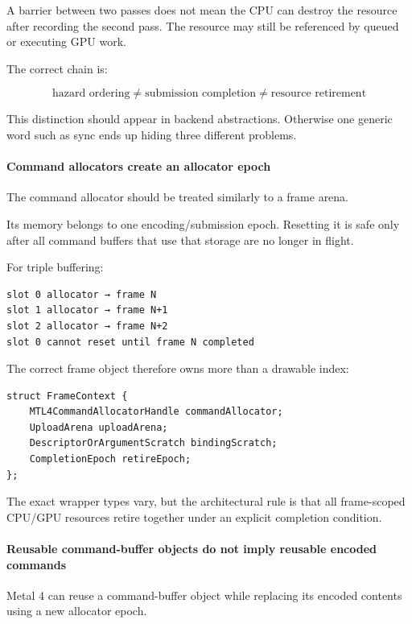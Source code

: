 A barrier between two passes does not mean the CPU can destroy the resource after recording the second pass. The resource may still be referenced by queued or executing GPU work.

The correct chain is:

\[
\boxed{
\text{hazard ordering}
\neq
\text{submission completion}
\neq
\text{resource retirement}
}
\]

This distinction should appear in backend abstractions. Otherwise one generic word such as sync ends up hiding three different problems.

\paragraph{Command allocators create an allocator epoch}\label{command-allocators-create-an-allocator-epoch}

The command allocator should be treated similarly to a frame arena.

Its memory belongs to one encoding/submission epoch. Resetting it is safe only after all command buffers that use that storage are no longer in flight.

For triple buffering:

\begin{verbatim}
slot 0 allocator → frame N
slot 1 allocator → frame N+1
slot 2 allocator → frame N+2
slot 0 cannot reset until frame N completed
\end{verbatim}

The correct frame object therefore owns more than a drawable index:

\begin{verbatim}
struct FrameContext {
    MTL4CommandAllocatorHandle commandAllocator;
    UploadArena uploadArena;
    DescriptorOrArgumentScratch bindingScratch;
    CompletionEpoch retireEpoch;
};
\end{verbatim}

The exact wrapper types vary, but the architectural rule is that all frame-scoped CPU/GPU resources retire together under an explicit completion condition.

\paragraph{Reusable command-buffer objects do not imply reusable encoded commands}\label{reusable-command-buffer-objects-do-not-imply-reusable-encoded-commands}

Metal 4 can reuse a command-buffer object while replacing its encoded contents using a new allocator epoch.

